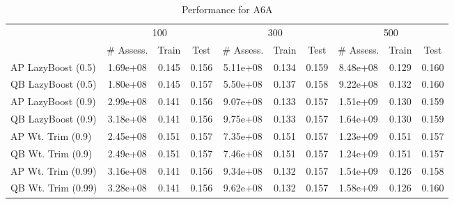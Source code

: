 \begin{table*}[ht]
\caption{Performance for A6A}
\label{tbl:perf-a6a}
\vskip 0.15in
\begin{center}
\begin{small}
\begin{sc}
\begin{tabular}{lccccccccc}
\toprule
	& \multicolumn{3}{c}{100}
	& \multicolumn{3}{c}{300}
	& \multicolumn{3}{c}{500}
	\\
 & \# Assess. & Train & Test & \# Assess. & Train & Test & \# Assess. & Train & Test \\
\midrule
AP LazyBoost (0.5) & 1.69e+08 & 0.145 & 0.156 & 5.11e+08 & 0.134 & 0.159 & 8.48e+08 & 0.129 & 0.160 \\
QB LazyBoost (0.5) & 1.80e+08 & 0.145 & 0.157 & 5.50e+08 & 0.137 & 0.158 & 9.22e+08 & 0.132 & 0.160 \\
AP LazyBoost (0.9) & 2.99e+08 & 0.141 & 0.156 & 9.07e+08 & 0.133 & 0.157 & 1.51e+09 & 0.130 & 0.159 \\
QB LazyBoost (0.9) & 3.18e+08 & 0.141 & 0.156 & 9.75e+08 & 0.133 & 0.157 & 1.64e+09 & 0.130 & 0.159 \\
AP Wt. Trim (0.9) & 2.45e+08 & 0.151 & 0.157 & 7.35e+08 & 0.151 & 0.157 & 1.23e+09 & 0.151 & 0.157 \\
QB Wt. Trim (0.9) & 2.49e+08 & 0.151 & 0.157 & 7.46e+08 & 0.151 & 0.157 & 1.24e+09 & 0.151 & 0.157 \\
AP Wt. Trim (0.99) & 3.16e+08 & 0.141 & 0.156 & 9.34e+08 & 0.132 & 0.157 & 1.54e+09 & 0.126 & 0.158 \\
QB Wt. Trim (0.99) & 3.28e+08 & 0.141 & 0.156 & 9.62e+08 & 0.132 & 0.157 & 1.58e+09 & 0.126 & 0.160 \\
\bottomrule
\end{tabular}
\end{sc}
\end{small}
\end{center}
\vskip -0.1in
\end{table*}
